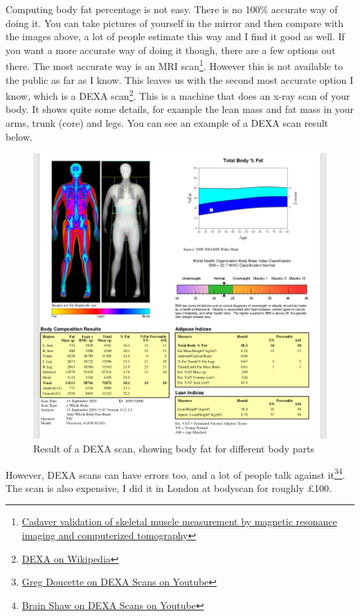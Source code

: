 \documentclass[openany, 12pt]{book}
\begin{document}
	Computing body fat percentage is not easy. There is no 100\% accurate way of doing it. You can take pictures of yourself in the mirror and then compare with the images above, a lot of people estimate this way and I find it good as well. If you want a more accurate way of doing it though, there are a few options out there. The most accurate way is an MRI scan\footnote{\href{https://pubmed.ncbi.nlm.nih.gov/9655763/}{Cadaver validation of skeletal muscle measurement by magnetic resonance imaging and computerized tomography}}. However this is not available to the public as far as I know. This leaves us with the second most accurate option I know, which is a DEXA scan\footnote{\href{https://en.wikipedia.org/wiki/Dual-energy_X-ray_absorptiometry}{DEXA on Wikipedia}}. This is a machine that does an x-ray scan of your body. It shows quite some details, for example the lean mass and fat mass in your arms, trunk (core) and legs. You can see an example of a DEXA scan result below.
	\begin{figure}[h]
		\centering
		\includegraphics[scale=0.5]{dexa-scan.png}
		\caption{Result of a DEXA scan, showing body fat for different body parts}
	\end{figure}
However, DEXA scans can have errors too, and a lot of people talk against it\footnote{\href{https://www.youtube.com/watch?v=2Gg4Jm5KS1Y}{Greg Doucette on DEXA Scans on Youtube}}\footnote{\href{https://www.youtube.com/watch?v=P17bcpYE8Ew}{Brain Shaw on DEXA Scans on Youtube}}. The scan is also expensive, I did it in London at bodyscan for roughly \pounds 100.
	
\end{document}
